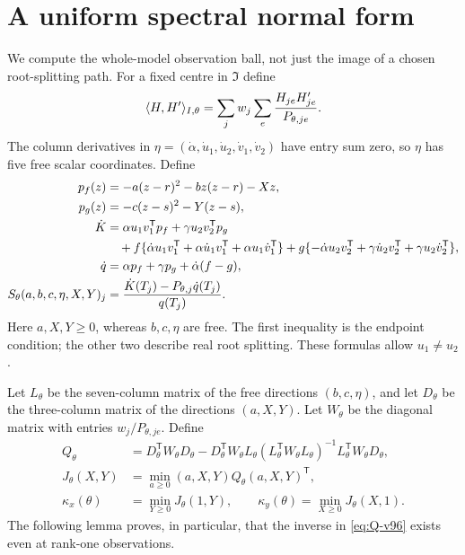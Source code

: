 \section{A uniform spectral normal form}
\label{sec:uniform-normal-v96}
We compute the whole-model observation ball, not just the image of a
chosen root-splitting path. For a fixed centre in $\mathfrak I$ define
\[
 \langle H,H'\rangle_{I,\theta}
   =\sum_jw_j\sum_e{H_{je}H'_{je}\over P_{\theta,je}}.
\]
The column derivatives in
$\eta=(\dot\alpha,\dot u_1,\dot u_2,\dot v_1,\dot v_2)$ have entry
sum zero, so $\eta$ has five free scalar coordinates. Define
\begin{align}
 p_f(z)&=-a(z-r)^2-bz(z-r)-Xz,\nonumber\\
 p_g(z)&=-c(z-s)^2-Y(z-s),\label{eq:jets-v96}\\
 \dot K&=\alpha u_1v_1^{\mathsf T}p_f
              +\gamma u_2v_2^{\mathsf T}p_g\nonumber\\
 &\quad+f\{\dot\alpha u_1v_1^{\mathsf T}
        +\alpha\dot u_1v_1^{\mathsf T}+\alpha u_1\dot v_1^{\mathsf T}\}
       +g\{-\dot\alpha u_2v_2^{\mathsf T}
        +\gamma\dot u_2v_2^{\mathsf T}+\gamma u_2\dot v_2^{\mathsf T}\},\nonumber\\
 \dot q&=\alpha p_f+\gamma p_g+\dot\alpha(f-g),\nonumber\\
 S_\theta(a,b,c,\eta,X,Y)_j
   &={\dot K(T_j)-P_{\theta,j}\dot q(T_j)\over q(T_j)}.\label{eq:score-v96}
\end{align}
Here $a,X,Y\ge0$, whereas $b,c,\eta$ are free. The first inequality
is the endpoint condition; the other two describe real root splitting.
These formulas allow $u_1\ne u_2$.

Let $L_\theta$ be the seven-column matrix of the free directions
$(b,c,\eta)$, and let $D_\theta$ be the three-column matrix of the
directions $(a,X,Y)$. Let $W_\theta$ be the diagonal matrix with entries
$w_j/P_{\theta,je}$. Define
\begin{align}
 Q_\theta&=D_\theta^{\mathsf T}W_\theta D_\theta
 -D_\theta^{\mathsf T}W_\theta L_\theta
 (L_\theta^{\mathsf T}W_\theta L_\theta)^{-1}
 L_\theta^{\mathsf T}W_\theta D_\theta,\label{eq:Q-v96}\\
 J_\theta(X,Y)&=\min_{a\ge0}(a,X,Y)Q_\theta(a,X,Y)^{\mathsf T},\nonumber\\
 \kappa_x(\theta)&=\min_{Y\ge0}J_\theta(1,Y),\qquad
 \kappa_y(\theta)=\min_{X\ge0}J_\theta(X,1).\label{eq:kappas-v96}
\end{align}
The following lemma proves, in particular, that the inverse in
\eqref{eq:Q-v96} exists even at rank-one observations.


